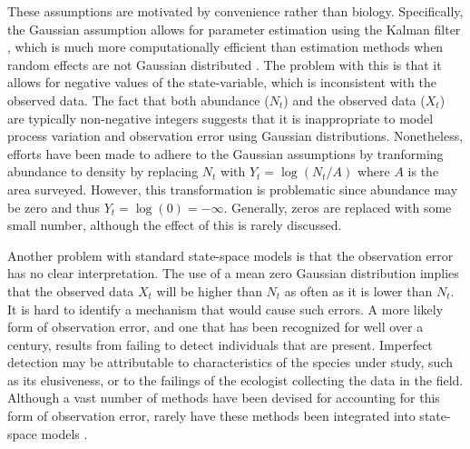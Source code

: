 \documentclass[12pt]{article}
\begin{document}
These assumptions are motivated by
convenience rather than biology. Specifically, the Gaussian assumption
allows for parameter estimation using the Kalman filter
\citep{dennis_etal:2006}, which is much more computationally efficient
than estimation methods when random effects are not Gaussian distributed
\citep{devalpine_hastings:2002}. The problem with this is that it
allows for negative values of the state-variable, which is
inconsistent with the observed data. The fact that both abundance ($N_t$) and the observed data ($X_t$) are
typically non-negative integers suggests that it is inappropriate to
model process variation and observation error using Gaussian
distributions. Nonetheless, efforts have been made to adhere to the
Gaussian assumptions by tranforming abundance to
density by replacing $N_t$ with $Y_t = \log(N_t/A)$ where $A$ is the
area surveyed. However, this transformation is problematic since
abundance may be zero and thus $Y_t = \log(0) = -\infty$. Generally,
zeros are replaced with some small number, although the
effect of this is rarely discussed.

Another problem with standard state-space models is that the
observation error has no clear interpretation. The use of a mean zero
Gaussian distribution implies that the observed data $X_t$ will be
higher than $N_t$ as often as it is lower than $N_t$. It is hard
to identify a mechanism that would cause such errors. A more likely
form of observation error, and one that has been recognized for well
over a century, results from failing to detect individuals that are
present. Imperfect detection may be attributable to
characteristics of the species under study, such as its elusiveness,
or to the failings of the ecologist collecting the data in the field.
Although a vast number of methods have been devised for accounting for
this form of observation error, rarely have these methods been
integrated into state-space models \citep[but
see][]{buckland_etal:2004}.
\end{document}

